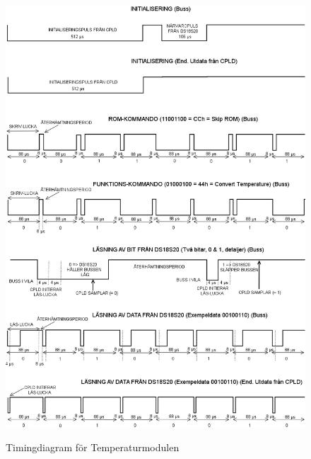 \documentclass[a4paper,11pt]{article}
\begin{document}
		\begin{figure}[H]
		  \centering
		      \includegraphics[scale=0.38, angle=0]{TempTiming.png}
			\label{fig:TempTiming}
		  	\caption{Timingdiagram för Temperaturmodulen}
		\end{figure}
\end{document}
